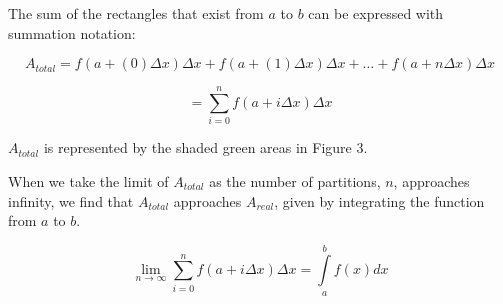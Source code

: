 \documentclass{article}
\begin{document}
    The sum of the rectangles that exist from \( a \) to \( b \) can be expressed
    with summation notation:

    \[ A_{total} = f(a+(0)\Delta x)\Delta x + f(a+(1)\Delta x)\Delta x + \dots + f(a+n\Delta x)\Delta x \]

    \[ = \displaystyle\sum_{i=0}^n f(a+i\Delta x)\Delta x \]

    \( A_{total} \) is represented by the shaded green areas in Figure 3.

    When we take the limit of \( A_{total} \) as the number of partitions, \( n \),
    approaches infinity, we find that \( A_{total} \) approaches \( A_{real} \),
    given by integrating the function from \( a \) to \( b \).

    \[ \displaystyle\lim_{n \to \infty}\sum_{i=0}^n f(a+i\Delta x)\Delta x = \int\limits_a^b f(x)dx \]
\end{document}
